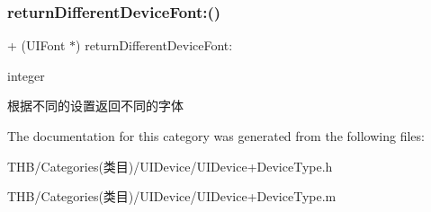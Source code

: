 \subsubsection{\texorpdfstring{return\+Different\+Device\+Font\+:()}{returnDifferentDeviceFont:()}}
{\footnotesize\ttfamily + (U\+I\+Font $\ast$) return\+Different\+Device\+Font\+: \begin{DoxyParamCaption}\item[{(N\+S\+Integer)}]{integer }\end{DoxyParamCaption}}

根据不同的设置返回不同的字体 

The documentation for this category was generated from the following files\+:\begin{DoxyCompactItemize}
\item 
T\+H\+B/\+Categories(类目)/\+U\+I\+Device/U\+I\+Device+\+Device\+Type.\+h\item 
T\+H\+B/\+Categories(类目)/\+U\+I\+Device/U\+I\+Device+\+Device\+Type.\+m\end{DoxyCompactItemize}
